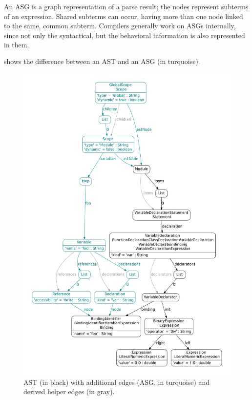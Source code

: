 An ASG is a graph representation of a parse result; the nodes represent subterms of an expression. Shared subterms can occur, having more than one node linked to the same, common subterm. Compilers generally work on ASGs internally, since not only the syntactical, but the behavioral information is also represented in them.


 shows the difference between an AST and an ASG (in turquoise).

\begin{figure}[!htb]
	\centering
	\includegraphics[height=\textheight, trim=1cm 1cm 1cm 1cm,clip]{include/figures/AST-ASG}
	\caption{AST (in black) with additional edges (ASG, in turquoise) and derived helper edges (in gray).}
	\label{fig:ast-asg-example}
\end{figure}

